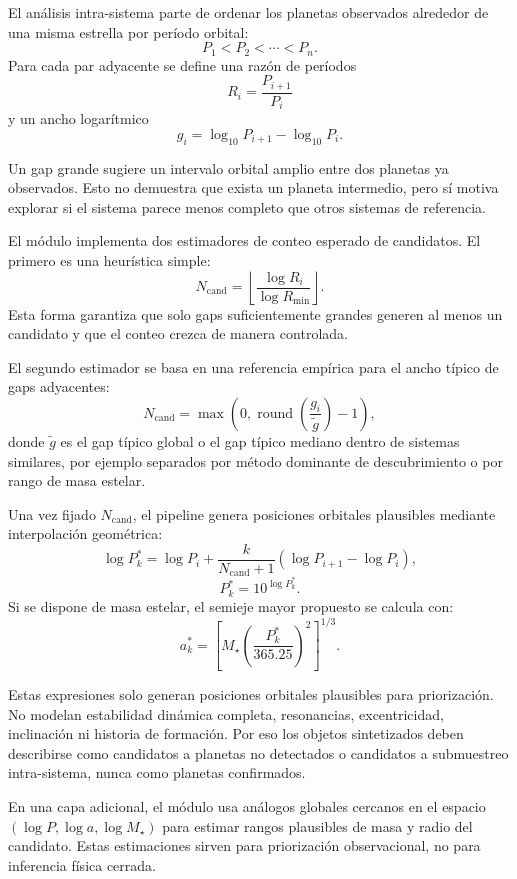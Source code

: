 El an\'alisis intra-sistema parte de ordenar los planetas observados alrededor de una misma estrella por per\'iodo orbital:
\[
P_1 < P_2 < \cdots < P_n.
\]
Para cada par adyacente se define una raz\'on de per\'iodos
\[
R_i = \frac{P_{i+1}}{P_i}
\]
y un ancho logar\'itmico
\[
g_i = \log_{10} P_{i+1} - \log_{10} P_i.
\]

Un gap grande sugiere un intervalo orbital amplio entre dos planetas ya observados. Esto no demuestra que exista un planeta intermedio, pero s\'i motiva explorar si el sistema parece menos completo que otros sistemas de referencia.

El m\'odulo implementa dos estimadores de conteo esperado de candidatos. El primero es una heur\'istica simple:
\[
N_{\mathrm{cand}} =
\left\lfloor
\frac{\log R_i}{\log R_{\min}}
\right\rfloor.
\]
Esta forma garantiza que solo gaps suficientemente grandes generen al menos un candidato y que el conteo crezca de manera controlada.

El segundo estimador se basa en una referencia emp\'irica para el ancho t\'ipico de gaps adyacentes:
\[
N_{\mathrm{cand}} =
\max\left(
0,
\operatorname{round}\left(\frac{g_i}{\tilde g}\right)-1
\right),
\]
donde $\tilde g$ es el gap t\'ipico global o el gap t\'ipico mediano dentro de sistemas similares, por ejemplo separados por m\'etodo dominante de descubrimiento o por rango de masa estelar.

Una vez fijado $N_{\mathrm{cand}}$, el pipeline genera posiciones orbitales plausibles mediante interpolaci\'on geom\'etrica:
\[
\log P_k^\ast =
\log P_i +
\frac{k}{N_{\mathrm{cand}}+1}
\left(\log P_{i+1}-\log P_i\right),
\]
\[
P_k^\ast = 10^{\log P_k^\ast}.
\]
Si se dispone de masa estelar, el semieje mayor propuesto se calcula con:
\[
a_k^\ast =
\left[
M_\star
\left(
\frac{P_k^\ast}{365.25}
\right)^2
\right]^{1/3}.
\]

Estas expresiones solo generan posiciones orbitales plausibles para priorizaci\'on. No modelan estabilidad din\'amica completa, resonancias, excentricidad, inclinaci\'on ni historia de formaci\'on. Por eso los objetos sintetizados deben describirse como candidatos a planetas no detectados o candidatos a submuestreo intra-sistema, nunca como planetas confirmados.

En una capa adicional, el m\'odulo usa an\'alogos globales cercanos en el espacio $\left(\log P, \log a, \log M_\star\right)$ para estimar rangos plausibles de masa y radio del candidato. Estas estimaciones sirven para priorizaci\'on observacional, no para inferencia f\'isica cerrada.
